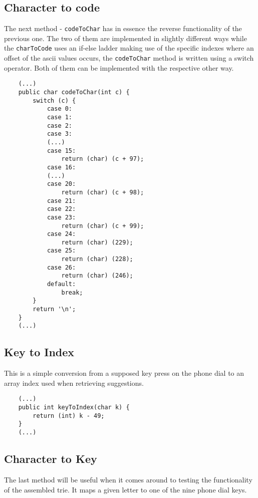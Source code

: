 \documentclass[a4paper,11pt]{article}
\begin{document}
\subsection*{Character to code}

The next method - {\tt codeToChar} has in essence the reverse functionality of the previous one. The two of them are implemented in slightly different ways while the {\tt charToCode} uses an if-else ladder making use of the specific indexes where an offset of the ascii values occurs, the {\tt codeToChar} method is written using a switch operator. Both of them can be implemented with the respective other way.

\begin{verbatim}
    (...)
    public char codeToChar(int c) {
        switch (c) {
            case 0:
            case 1:
            case 2:
            case 3:
            (...)
            case 15:
                return (char) (c + 97);
            case 16:
            (...)
            case 20:
                return (char) (c + 98);
            case 21:
            case 22:
            case 23:
                return (char) (c + 99);
            case 24:
                return (char) (229);
            case 25:
                return (char) (228);
            case 26:
                return (char) (246);
            default:
                break;
        }
        return '\n';
    }
    (...)
\end{verbatim}

\subsection*{Key to Index}
This is a simple conversion from a supposed key press on the phone dial to an array index used when retrieving suggestions.

\begin{verbatim}
    (...)
    public int keyToIndex(char k) {
        return (int) k - 49;
    }
    (...)
\end{verbatim}

\subsection*{Character to Key}

The last method will be useful when it comes around to testing the functionality of the assembled trie. It maps a given letter to one of the nine phone dial keys.
\end{document}

